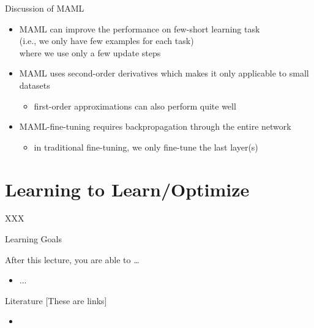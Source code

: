 \begin{frame}[c]{Discussion of MAML}

\begin{itemize}
	\item MAML can improve the performance on \alert{few-short learning task}\\
	(i.e., we only have few examples for each task)\\
	where we use only a \alert{few update steps}
	\pause
	\smallskip
	\item MAML uses \alert{second-order derivatives} which makes it only applicable to small datasets\\
	\begin{itemize}
		\item first-order approximations can also perform quite well
	\end{itemize}
	\pause
	\smallskip
	\item MAML-fine-tuning requires \alert{backpropagation through the entire network}
	\begin{itemize}
		\item in traditional fine-tuning, we only fine-tune the last layer(s)
	\end{itemize}
	
\end{itemize}

\end{frame}
\section{Learning to Learn/Optimize}
\begin{frame}[c]{XXX}



\end{frame}

\begin{frame}[c]{Learning Goals}

After this lecture, you are able to \ldots

\begin{itemize}
	\item ...
\end{itemize}
\end{frame}

\begin{frame}[c]{Literature [These are links]}

\begin{itemize}
	\item \lit{\href{}{}}	
\end{itemize}

\end{frame}


